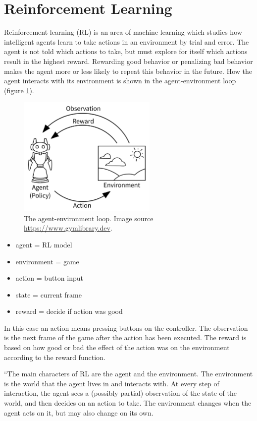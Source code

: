 \documentclass[11pt,a4paper]{article}
\begin{document}
\section{Reinforcement Learning}
Reinforcement learning (RL) is an area of machine learning which studies how intelligent agents learn to take actions in an environment by trial and error.
The agent is not told which actions to take, but must explore for itself which actions result in the highest reward.
Rewarding good behavior or penalizing bad behavior makes the agent more or less likely to repeat this behavior in the future.
How the agent interacts with its environment is shown in the agent-environment loop (figure \ref{fig:loop}).
\begin{figure}[htbp]
    \centering
    \includegraphics[width=0.6\textwidth]{AE_loop}
    \caption{The agent-environment loop. Image source \url{https://www.gymlibrary.dev}.}
    \label{fig:loop}
\end{figure}
\begin{itemize}
    \item agent = RL model
    \item environment = game
    \item action = button input
    \item state = current frame
    \item reward = decide if action was good
\end{itemize}
In this case an action means pressing buttons on the controller.
The observation is the next frame of the game after the action has been executed.
The reward is based on how good or bad the effect of the action was on the environment according to the reward function.

``The main characters of RL are the agent and the environment.
The environment is the world that the agent lives in and interacts with.
At every step of interaction, the agent sees a (possibly partial) observation of the state of the world, and then decides on an action to take.
The environment changes when the agent acts on it, but may also change on its own.
\end{document}
